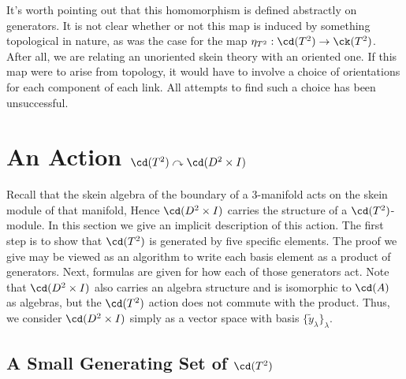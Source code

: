 \begin{remark}
It's worth pointing out that this homomorphism is defined abstractly on generators. It is not clear whether or not this map is induced by something topological in nature, as was the case for the map $\eta_{T^2}: \cd(T^2) \to \ck(T^2)$. After all, we are relating an unoriented skein theory with an oriented one. If this map were to arise from topology, it would have to involve a choice of orientations for each component of each link. All attempts to find such a choice has been unsuccessful.
\end{remark}


\section{An Action $\cd(T^2) \curvearrowright \cd(D^2 \times I)$} \label{sec:action}

Recall that the skein algebra of the boundary of a 3-manifold acts on the skein module of that manifold, Hence $\cd(D^2 \times I)$ carries the structure of a $\cd(T^2)$-module. In this section we give an implicit description of this action. The first step is to show that $\cd(T^2)$ is generated by five specific elements. The proof we give may be viewed as an algorithm to write each basis element as a product of generators. Next, formulas are given for how each of those generators act. Note that $\cd(D^2 \times I)$ also carries an algebra structure and is isomorphic to $\cd(A)$ as algebras, but the $\cd(T^2)$ action does not commute with the product. Thus, we consider $\cd(D^2 \times I)$ simply as a vector space with basis $\{\tilde{y}_\lambda \}_\lambda$.






\subsection{A Small Generating Set of $\cd(T^2)$} \label{sec:generators}

